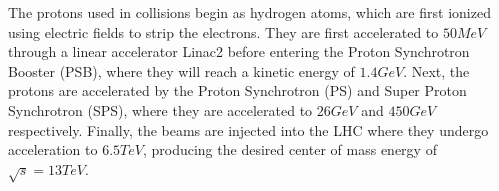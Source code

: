 The protons used in collisions begin as hydrogen atoms, which are first ionized using electric fields to strip the electrons. They are first accelerated to $50\unit{MeV}$ through a linear accelerator Linac2 before entering the Proton Synchrotron Booster (PSB), where they will reach a kinetic energy of $1.4\unit{GeV}$. Next, the protons are accelerated by the Proton Synchrotron (PS) and Super Proton Synchrotron (SPS), where they are accelerated to $26\unit{GeV}$ and $450\unit{GeV}$ respectively. Finally, the beams are injected into the LHC where they undergo acceleration to $6.5\unit{TeV}$, producing the desired center of mass energy of $\sqrt{s}=13\unit{TeV}$.

